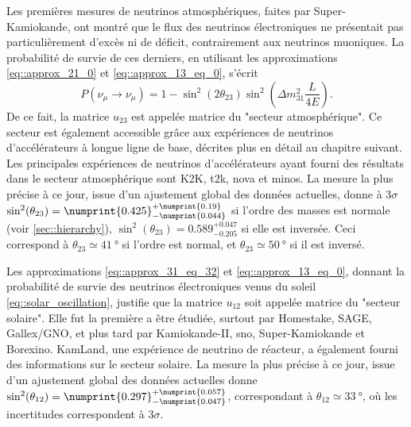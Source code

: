       Les premières mesures de neutrinos atmosphériques, faites par Super-Kamiokande\cite{Fukuda1998}, ont montré que le flux des neutrinos électroniques ne présentait pas particulièrement d'excès ni de déficit, contrairement aux neutrinos muoniques. La probabilité de survie de ces derniers, en utilisant les approximations \eqref{eq::approx_21_0} et \eqref{eq::approx_13_eq_0}, s'écrit
      \begin{equation}\label{eq::mu_approx_atmo}
        P(\nu_{\mu}\to\nu_{\mu}) = 1 - \sin^2(2\theta_{23})\sin^2\left(\Delta m^2_{31}\frac{L}{4E}\right).
      \end{equation}
      De ce fait, la matrice $u_{23}$ est appelée matrice du "secteur atmosphérique". Ce secteur est également accessible grâce aux expériences de neutrinos d'accélérateurs à longue ligne de base, décrites plus en détail au chapitre suivant. Les principales expériences de neutrinos d'accélérateurs ayant fourni des résultats dans le secteur atmosphérique sont K2K\cite{Collaboration2006a}, \gls{t2k}\cite{Abe2018}, \gls{nova}\cite{Adamson2016} et \gls{minos}\cite{Collaboration2014}. La mesure la plus précise à ce jour, issue d'un ajustement global des données actuelles, donne à $3\sigma$ $\sin^2(\theta_{23})=\numprint{0.425}^{+\numprint{0.19}}_{-\numprint{0.044}}$\cite{pdg2018} si l'ordre des masses est normale (voir \autoref{sec::hierarchy}), $\sin^2(\theta_{23})=0.589^{+0.047}_{-0.205}$ si elle est inversée. Ceci correspond à $\theta_{23}\simeq\SI{41}{\degree}$ si l'ordre est normal, et $\theta_{23}\simeq\SI{50}{\degree}$ si il est inversé.

      Les approximations \eqref{eq::approx_31_eq_32} et \eqref{eq::approx_13_eq_0}, donnant la probabilité de survie des neutrinos électroniques venus du soleil \eqref{eq::solar_oscillation}, justifie que la matrice $u_{12}$ soit appelée matrice du "secteur solaire". Elle fut la première a être étudiée, surtout par Homestake\cite{Lande1990}, SAGE\cite{Collaboration2009}, Gallex/GNO\cite{Hampel1999}, et plus tard par  Kamiokande-II\cite{Hirata1992}, \gls{sno}\cite{Aharmim2013}, Super-Kamiokande\cite{Abe2018} et Borexino\cite{Collaboration2013}. KamLand\cite{Collaboration2004}, une expérience de neutrino de réacteur, a également fourni des informations sur le secteur solaire. La mesure la plus précise à ce jour, issue d'un ajustement global des données actuelles donne $\sin^2(\theta_{12})=\numprint{0.297}^{+\numprint{0.057}}_{-\numprint{0.047}}$\cite{pdg2018}, correspondant à $\theta_{12}\simeq\SI{33}{\degree}$, où les incertitudes correspondent à $3\sigma$.

